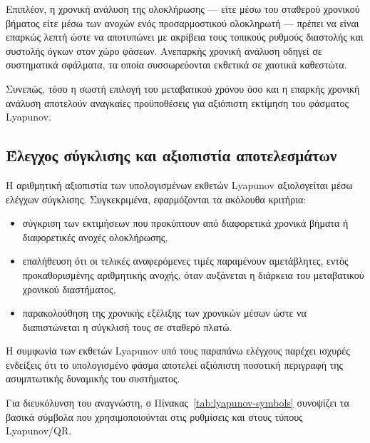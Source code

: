 \documentclass[11pt,a4paper]{report}
\begin{document}
Επιπλέον, η χρονική ανάλυση της ολοκλήρωσης — είτε μέσω του σταθερού
χρονικού βήματος είτε μέσω των ανοχών ενός προσαρμοστικού ολοκληρωτή —
πρέπει να είναι επαρκώς λεπτή ώστε να αποτυπώνει με ακρίβεια τους τοπικούς
ρυθμούς διαστολής και συστολής όγκων στον χώρο φάσεων.
Ανεπαρκής χρονική ανάλυση οδηγεί σε συστηματικά σφάλματα, τα οποία
συσσωρεύονται εκθετικά σε χαοτικά καθεστώτα.

Συνεπώς, τόσο η σωστή επιλογή του μεταβατικού χρόνου όσο και η επαρκής
χρονική ανάλυση αποτελούν αναγκαίες προϋποθέσεις για αξιόπιστη εκτίμηση
του φάσματος Lyapunov.

\subsection{Έλεγχος σύγκλισης και αξιοπιστία αποτελεσμάτων}

Η αριθμητική αξιοπιστία των υπολογισμένων εκθετών Lyapunov αξιολογείται
μέσω ελέγχων σύγκλισης.
Συγκεκριμένα, εφαρμόζονται τα ακόλουθα κριτήρια:
\begin{itemize}
  \item σύγκριση των εκτιμήσεων που προκύπτουν από διαφορετικά χρονικά
  βήματα ή διαφορετικές ανοχές ολοκλήρωσης,
  \item επαλήθευση ότι οι τελικές αναφερόμενες τιμές παραμένουν αμετάβλητες,
  εντός προκαθορισμένης αριθμητικής ανοχής, όταν αυξάνεται η διάρκεια του
  μεταβατικού χρονικού διαστήματος,
  \item παρακολούθηση της χρονικής εξέλιξης των χρονικών μέσων ώστε να
  διαπιστώνεται η σύγκλισή τους σε σταθερό πλατώ.
\end{itemize}

Η συμφωνία των εκθετών Lyapunov υπό τους παραπάνω ελέγχους παρέχει ισχυρές
ενδείξεις ότι το υπολογισμένο φάσμα αποτελεί αξιόπιστη ποσοτική περιγραφή
της ασυμπτωτικής δυναμικής του συστήματος.

Για διευκόλυνση του αναγνώστη, ο Πίνακας~\ref{tab:lyapunov-symbols} συνοψίζει τα βασικά σύμβολα που χρησιμοποιούνται στις ρυθμίσεις και στους τύπους Lyapunov/QR.
\end{document}
